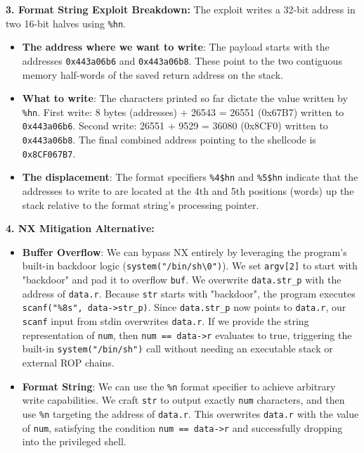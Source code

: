 \documentclass{article}
\begin{document}
\textbf{3. Format String Exploit Breakdown:}
The exploit writes a 32-bit address in two 16-bit halves using \texttt{\%hn}.
\begin{itemize}
    \item \textbf{The address where we want to write}: The payload starts with the addresses \texttt{0x443a06b6} and \texttt{0x443a06b8}. These point to the two contiguous memory half-words of the saved return address on the stack.
    \item \textbf{What to write}: The characters printed so far dictate the value written by \texttt{\%hn}. First write: 8 bytes (addresses) + 26543 = 26551 (0x67B7) written to \texttt{0x443a06b6}. Second write: 26551 + 9529 = 36080 (0x8CF0) written to \texttt{0x443a06b8}. The final combined address pointing to the shellcode is \texttt{0x8CF067B7}.
    \item \textbf{The displacement}: The format specifiers \texttt{\%4\$hn} and \texttt{\%5\$hn} indicate that the addresses to write to are located at the 4th and 5th positions (words) up the stack relative to the format string's processing pointer.

\end{itemize}
\textbf{4. NX Mitigation Alternative:}
\begin{itemize}
    \item \textbf{Buffer Overflow}: We can bypass NX entirely by leveraging the program's built-in backdoor logic (\texttt{system("/bin/sh\textbackslash{}0")}). We set \texttt{argv[2]} to start with "backdoor" and pad it to overflow \texttt{buf}. We overwrite \texttt{data.str\_p} with the address of \texttt{data.r}. Because \texttt{str} starts with "backdoor", the program executes \texttt{scanf("\%8s", data->str\_p)}. Since \texttt{data.str\_p} now points to \texttt{data.r}, our \texttt{scanf} input from stdin overwrites \texttt{data.r}. If we provide the string representation of \texttt{num}, then \texttt{num == data->r} evaluates to true, triggering the built-in \texttt{system("/bin/sh")} call without needing an executable stack or external ROP chains.
    \item \textbf{Format String}: We can use the \texttt{\%n} format specifier to achieve arbitrary write capabilities. We craft \texttt{str} to output exactly \texttt{num} characters, and then use \texttt{\%n} targeting the address of \texttt{data.r}. This overwrites \texttt{data.r} with the value of \texttt{num}, satisfying the condition \texttt{num == data->r} and successfully dropping into the privileged shell.
\end{itemize}
\end{document}
